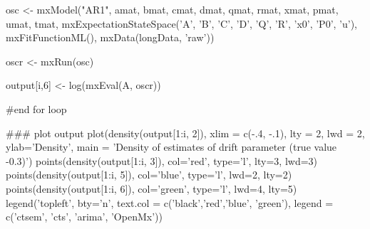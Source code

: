 \documentclass[nojss]{jss}\usepackage[]{graphicx}\usepackage[]{color}
\begin{document}
\begin{Schunk}
\begin{Sinput}
{osc <- mxModel("AR1", 
	amat, bmat, cmat, dmat, qmat, rmat, xmat, pmat, umat, tmat,
	mxExpectationStateSpace('A', 'B', 'C', 'D', 'Q', 'R', 'x0', 'P0', 'u'),
	mxFitFunctionML(),
	mxData(longData, 'raw'))

oscr <- mxRun(osc)

output[i,6] <-  log(mxEval(A, oscr))

} #end for loop

### plot output
plot(density(output[1:i, 2]), xlim = c(-.4, -.1), lty = 2, lwd = 2, 
  ylab='Density',
  main = 'Density of estimates of drift parameter (true value -0.3)')
points(density(output[1:i, 3]), col='red', type='l', lty=3, lwd=3)
points(density(output[1:i, 5]), col='blue', type='l', lwd=2, lty=2)
points(density(output[1:i, 6]), col='green', type='l', lwd=4, lty=5)
legend('topleft', bty='n', 
  text.col = c('black','red','blue', 'green'),
  legend = c('ctsem', 'cts', 'arima', 'OpenMx'))
\end{Sinput}
\end{Schunk}
\end{document}
